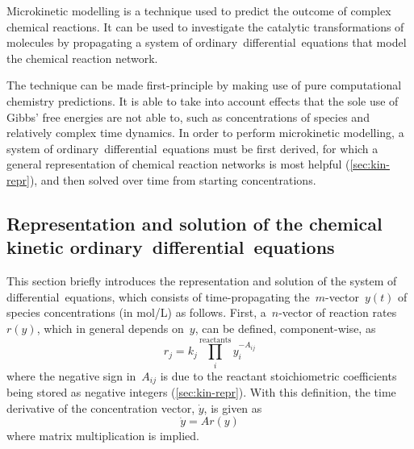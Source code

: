 Microkinetic modelling is a technique used to predict the outcome of complex chemical reactions.
It can be used to investigate the catalytic transformations of molecules by propagating a system of ordinary~differential~equations that model the chemical reaction network.

The technique can be made first-principle by making use of pure computational
chemistry predictions.
It is able to take into account effects that the sole use of Gibbs' free energies
are not able to,
such as concentrations of species and relatively complex time dynamics.
In order to perform microkinetic modelling,
a system of ordinary~differential~equations must be first derived,
for which a general representation of chemical reaction networks is most helpful (\cref{sec:kin-repr}),
and then solved over time from starting concentrations.

\subsection{Representation and solution of the chemical kinetic ordinary~differential~equations}

This section briefly introduces the representation and solution of the system of differential~equations,
which consists of time-propagating the~$m$-vector~$y(t)$ of species concentrations (in mol/L) as follows.
First,
a~$n$-vector of reaction rates~$r(y)$,
which in general depends on~$y$,
can be defined,
component-wise,
as
%
\begin{equation}
	r_j
	= k_j \prod_i^\text{reactants}
	y_i^{-A_{ij}}
\end{equation}
%
where the negative sign in~$A_{ij}$ is due to the reactant stoichiometric coefficients being stored as negative integers (\cref{sec:kin-repr}).
With this definition,
the time derivative of the concentration vector,
$\dot{y}$,
is given as
%
\begin{equation}\label{eq:master-equation}
	\dot{y} = A r(y)
\end{equation}
%
where matrix multiplication is implied.

